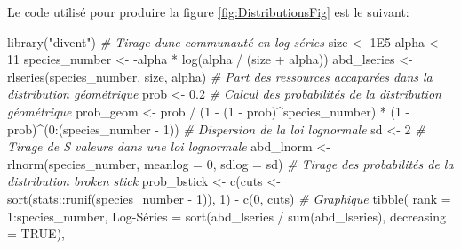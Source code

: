 \documentclass[
  11pt,
  american,
  a4paper,
  extrafontsizes,onecolumn,openright
  ]{memoir}
\newenvironment{Shaded}{\begin{snugshade}}{\end{snugshade}}
\newcommand{\AttributeTok}[1]{\textcolor[rgb]{0.77,0.63,0.00}{#1}}
\newcommand{\CommentTok}[1]{\textcolor[rgb]{0.56,0.35,0.01}{\textit{#1}}}
\newcommand{\ConstantTok}[1]{\textcolor[rgb]{0.00,0.00,0.00}{#1}}
\newcommand{\DecValTok}[1]{\textcolor[rgb]{0.00,0.00,0.81}{#1}}
\newcommand{\FloatTok}[1]{\textcolor[rgb]{0.00,0.00,0.81}{#1}}
\newcommand{\FunctionTok}[1]{\textcolor[rgb]{0.00,0.00,0.00}{#1}}
\newcommand{\NormalTok}[1]{#1}
\newcommand{\OtherTok}[1]{\textcolor[rgb]{0.56,0.35,0.01}{#1}}
\newcommand{\SpecialCharTok}[1]{\textcolor[rgb]{0.00,0.00,0.00}{#1}}
\newcommand{\StringTok}[1]{\textcolor[rgb]{0.31,0.60,0.02}{#1}}
\begin{document}
Le code utilisé pour produire la figure \ref{fig:DistributionsFig} est le suivant:

\scriptsize

\begin{Shaded}
\begin{Highlighting}[]
\FunctionTok{library}\NormalTok{(}\StringTok{"divent"}\NormalTok{)}
\CommentTok{\# Tirage d\textquotesingle{}une communauté en log{-}séries}
\NormalTok{size }\OtherTok{\textless{}{-}} \FloatTok{1E5}
\NormalTok{alpha }\OtherTok{\textless{}{-}} \DecValTok{11}
\NormalTok{species\_number }\OtherTok{\textless{}{-}} \SpecialCharTok{{-}}\NormalTok{alpha }\SpecialCharTok{*} \FunctionTok{log}\NormalTok{(alpha }\SpecialCharTok{/}\NormalTok{ (size }\SpecialCharTok{+}\NormalTok{ alpha))}
\NormalTok{abd\_lseries }\OtherTok{\textless{}{-}} \FunctionTok{rlseries}\NormalTok{(species\_number, size, alpha)}
\CommentTok{\# Part des ressources accaparées dans la distribution géométrique}
\NormalTok{prob }\OtherTok{\textless{}{-}} \FloatTok{0.2}
\CommentTok{\# Calcul des probabilités de la distribution géométrique}
\NormalTok{prob\_geom }\OtherTok{\textless{}{-}}\NormalTok{ prob }\SpecialCharTok{/}\NormalTok{ (}\DecValTok{1} \SpecialCharTok{{-}}\NormalTok{ (}\DecValTok{1} \SpecialCharTok{{-}}\NormalTok{ prob)}\SpecialCharTok{\^{}}\NormalTok{species\_number) }\SpecialCharTok{*}\NormalTok{ (}\DecValTok{1} \SpecialCharTok{{-}}\NormalTok{ prob)}\SpecialCharTok{\^{}}\NormalTok{(}\DecValTok{0}\SpecialCharTok{:}\NormalTok{(species\_number }\SpecialCharTok{{-}} \DecValTok{1}\NormalTok{))}
\CommentTok{\# Dispersion de la loi lognormale}
\NormalTok{sd }\OtherTok{\textless{}{-}} \DecValTok{2}
\CommentTok{\# Tirage de S valeurs dans une loi lognormale}
\NormalTok{abd\_lnorm }\OtherTok{\textless{}{-}} \FunctionTok{rlnorm}\NormalTok{(species\_number, }\AttributeTok{meanlog =} \DecValTok{0}\NormalTok{, }\AttributeTok{sdlog =}\NormalTok{ sd)}
\CommentTok{\# Tirage des probabilités de la distribution broken stick}
\NormalTok{prob\_bstick }\OtherTok{\textless{}{-}} \FunctionTok{c}\NormalTok{(cuts }\OtherTok{\textless{}{-}} \FunctionTok{sort}\NormalTok{(stats}\SpecialCharTok{::}\FunctionTok{runif}\NormalTok{(species\_number }\SpecialCharTok{{-}} \DecValTok{1}\NormalTok{)), }\DecValTok{1}\NormalTok{) }\SpecialCharTok{{-}} \FunctionTok{c}\NormalTok{(}\DecValTok{0}\NormalTok{, cuts)}
\CommentTok{\# Graphique}
\FunctionTok{tibble}\NormalTok{(}
  \AttributeTok{rank =} \DecValTok{1}\SpecialCharTok{:}\NormalTok{species\_number,}
  \StringTok{\textasciigrave{}}\AttributeTok{Log{-}Séries}\StringTok{\textasciigrave{}} \OtherTok{=} \FunctionTok{sort}\NormalTok{(abd\_lseries }\SpecialCharTok{/} \FunctionTok{sum}\NormalTok{(abd\_lseries), }\AttributeTok{decreasing =} \ConstantTok{TRUE}\NormalTok{),}

\end{Highlighting}
\end{Shaded}
\end{document}
